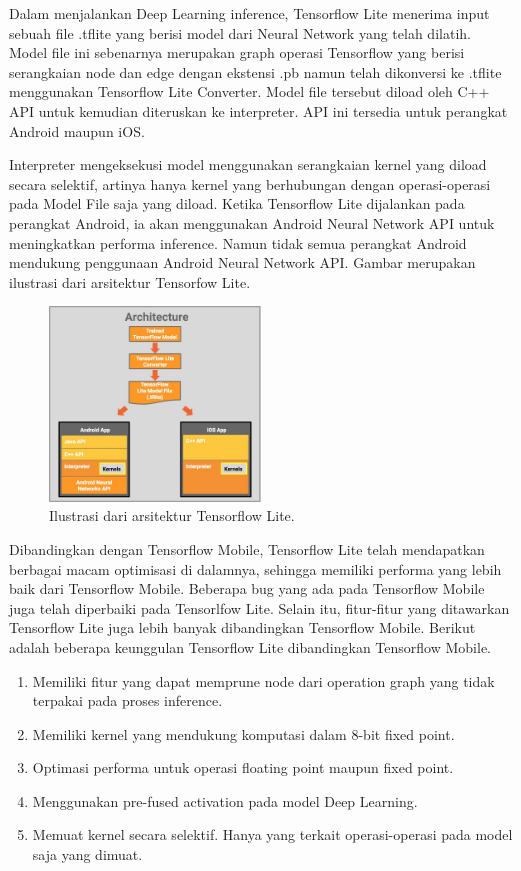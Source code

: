 Dalam menjalankan Deep Learning inference, Tensorflow Lite menerima input sebuah file .tflite yang berisi model dari Neural Network yang telah dilatih. Model file ini sebenarnya merupakan graph operasi Tensorflow yang berisi serangkaian node dan edge dengan ekstensi .pb namun telah dikonversi ke .tflite menggunakan Tensorflow Lite Converter. Model file tersebut diload oleh C++ API untuk kemudian diteruskan ke interpreter. API ini tersedia untuk perangkat Android maupun iOS. 

Interpreter mengeksekusi model menggunakan serangkaian kernel yang diload secara selektif, artinya hanya kernel yang berhubungan dengan operasi-operasi pada Model File saja yang diload. Ketika Tensorflow Lite dijalankan pada perangkat Android, ia akan menggunakan Android Neural Network API untuk meningkatkan performa inference. Namun tidak semua perangkat Android mendukung penggunaan Android Neural Network API. Gambar merupakan ilustrasi dari arsitektur Tensorfow Lite.

\begin{figure}
	\centering
	\includegraphics[width=0.50\textwidth]
	{pics/tflite.jpg}
	\caption{Ilustrasi dari arsitektur Tensorflow Lite.}
	\label{fig:tflite}
\end{figure}

Dibandingkan dengan Tensorflow Mobile, Tensorflow Lite telah mendapatkan berbagai macam optimisasi di dalamnya, sehingga memiliki performa yang lebih baik dari Tensorflow Mobile. Beberapa bug yang ada pada Tensorflow Mobile juga telah diperbaiki pada Tensorlfow Lite. Selain itu, fitur-fitur yang ditawarkan Tensorflow Lite juga lebih banyak dibandingkan Tensorflow Mobile.
Berikut adalah beberapa keunggulan Tensorflow Lite dibandingkan Tensorflow Mobile.

\begin{enumerate}
	\item Memiliki fitur yang dapat memprune node dari operation graph yang tidak terpakai pada proses inference.
	\item Memiliki kernel yang mendukung komputasi dalam 8-bit fixed point.
	\item Optimasi performa untuk operasi floating point maupun fixed point.
	\item Menggunakan pre-fused activation pada model Deep Learning.
	\item Memuat kernel secara selektif. Hanya yang terkait operasi-operasi pada model saja yang dimuat.
\end{enumerate}


